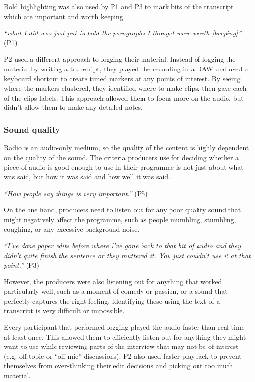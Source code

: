 Bold highlighting was also used by P1 and P3 to mark bits of the transcript
which are important and worth keeping.

\textit{``what I did was just put in bold the paragraphs I thought were worth
  [keeping]''} (P1)

P2 used a different approach to logging their material. Instead of logging the material by writing a transcript, they
played the recording in a DAW and used a keyboard shortcut to create timed markers at any points of interest. By seeing
where the markers clustered, they identified where to make clips, then gave each of the clips labels. This approach
allowed them to focus more on the audio, but didn't allow them to make any detailed notes.

\subsubsection{Sound quality}\label{sec:existing-quality}

Radio is an audio-only medium, so the quality of the content is highly dependent on the quality of the sound.  The
criteria producers use for deciding whether a piece of audio is good enough to use in their programme is not just about
what was said, but how it was said and how well it was said.

\textit{``How people say things is very important.''} (P5)

On the one hand, producers need to listen out for any poor quality sound that might negatively affect the programme,
such as people mumbling, stumbling, coughing, or any excessive background noise. 

\textit{``I've done paper edits before where I've gone back to that bit of audio and they didn't quite finish the
  sentence or they muttered it. You just couldn't use it at that point.''} (P3)

However, the producers were also listening out for anything that worked particularly well, such as a moment of
comedy or passion, or a sound that perfectly captures the right feeling. Identifying these using the text of a
transcript is very difficult or impossible. 

Every participant that performed logging played the audio faster than real time at least once. This allowed them to
efficiently listen out for anything they might want to use while reviewing parts of the interview that may not be of
interest (e.g. off-topic or ``off-mic'' discussions).  P2 also used faster playback to prevent themselves from
over-thinking their edit decisions and picking out too much material.

